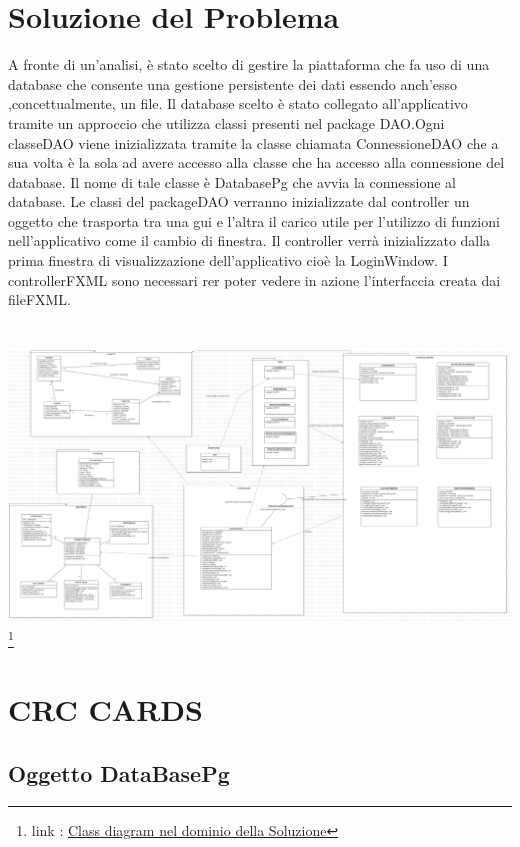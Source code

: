 \documentclass[11pt]{article}
\begin{document}
	\section{Soluzione del Problema}
	A fronte di un’analisi, è stato scelto di gestire la piattaforma che fa uso di una database che consente una gestione persistente dei dati essendo anch'esso ,concettualmente, un file. 
	Il database scelto è stato collegato all'applicativo tramite un approccio che utilizza classi presenti nel package DAO.Ogni classeDAO viene inizializzata tramite la classe chiamata ConnessioneDAO 
	che a sua volta è la sola ad avere accesso alla classe che ha accesso alla connessione del database. Il nome di tale classe è DatabasePg che avvia la connessione al database.
	Le classi del packageDAO verranno inizializzate dal controller un oggetto che trasporta tra una gui e l'altra il carico utile per l'utilizzo di funzioni nell'applicativo come il cambio di finestra.
	Il controller verrà inizializzato dalla prima finestra di visualizzazione dell'applicativo cioè la LoginWindow. I controllerFXML sono necessari rer poter vedere in azione l'interfaccia creata dai fileFXML.
	\\
	\\
	\\
	\includegraphics[width=1\linewidth]{dominio Della soluzione.png} \footnote{link : \href{https://github.com/torcy-it/PROGETTO-BD-OO}{Class diagram nel dominio della Soluzione}}
	
	\clearpage

	\section{CRC CARDS}
	

	\subsection{Oggetto DataBasePg}
\end{document}
